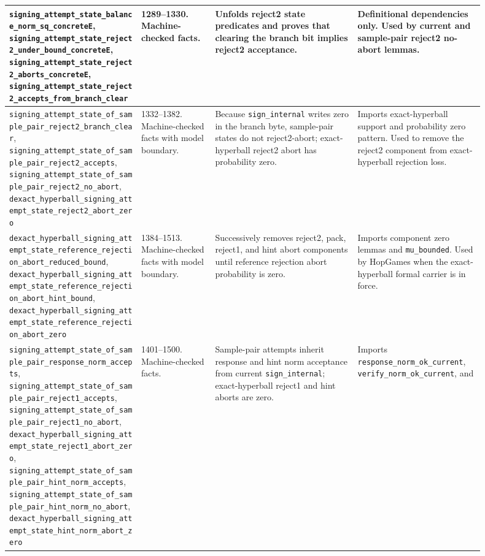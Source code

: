 \documentclass[11pt]{report}
\DeclareRobustCommand{\ec}[1]{\ifmmode\text{\nolinkurl{#1}}\else\nolinkurl{#1}\fi}
\theoremstyle{definition}
\theoremstyle{plain}
\begin{document}
{\begin{longtable}{p{0.25\linewidth}p{0.14\linewidth}p{0.27\linewidth}p{0.24\linewidth}}
\midrule
\ec{signing\_attempt\_state\_balance\_norm\_sq\_concreteE},
\ec{signing\_attempt\_state\_reject2\_under\_bound\_concreteE},
\ec{signing\_attempt\_state\_reject2\_aborts\_concreteE},
\ec{signing\_attempt\_state\_reject2\_accepts\_from\_branch\_clear} &
1289--1330. Machine-checked facts. &
Unfolds reject2 state predicates and proves that clearing the branch bit
implies reject2 acceptance. &
Definitional dependencies only.  Used by current and sample-pair reject2
no-abort lemmas. \\
\midrule
\ec{signing\_attempt\_state\_of\_sample\_pair\_reject2\_branch\_clear},
\ec{signing\_attempt\_state\_of\_sample\_pair\_reject2\_accepts},
\ec{signing\_attempt\_state\_of\_sample\_pair\_reject2\_no\_abort},
\ec{dexact\_hyperball\_signing\_attempt\_state\_reject2\_abort\_zero} &
1332--1382. Machine-checked facts with model boundary. &
Because \ec{sign\_internal} writes zero in the branch byte, sample-pair states
do not reject2-abort; exact-hyperball reject2 abort has probability zero. &
Imports exact-hyperball support and probability zero pattern.  Used to remove
the reject2 component from exact-hyperball rejection loss. \\
\midrule
\ec{dexact\_hyperball\_signing\_attempt\_state\_reference\_rejection\_abort\_reduced\_bound},
\ec{dexact\_hyperball\_signing\_attempt\_state\_reference\_rejection\_abort\_hint\_bound},
\ec{dexact\_hyperball\_signing\_attempt\_state\_reference\_rejection\_abort\_zero} &
1384--1513. Machine-checked facts with model boundary. &
Successively removes reject2, pack, reject1, and hint abort components until
reference rejection abort probability is zero. &
Imports component zero lemmas and \ec{mu\_bounded}.  Used by HopGames when the
exact-hyperball formal carrier is in force. \\
\midrule
\ec{signing\_attempt\_state\_of\_sample\_pair\_response\_norm\_accepts},
\ec{signing\_attempt\_state\_of\_sample\_pair\_reject1\_accepts},
\ec{signing\_attempt\_state\_of\_sample\_pair\_reject1\_no\_abort},
\ec{dexact\_hyperball\_signing\_attempt\_state\_reject1\_abort\_zero},
\ec{signing\_attempt\_state\_of\_sample\_pair\_hint\_norm\_accepts},
\ec{signing\_attempt\_state\_of\_sample\_pair\_hint\_norm\_no\_abort},
\ec{dexact\_hyperball\_signing\_attempt\_state\_hint\_norm\_abort\_zero} &
1401--1500. Machine-checked facts. &
Sample-pair attempts inherit response and hint norm acceptance from current
\ec{sign\_internal}; exact-hyperball reject1 and hint aborts are zero. &
Imports \ec{response\_norm\_ok\_current}, \ec{verify\_norm\_ok\_current}, and

\end{longtable}}
\end{document}
